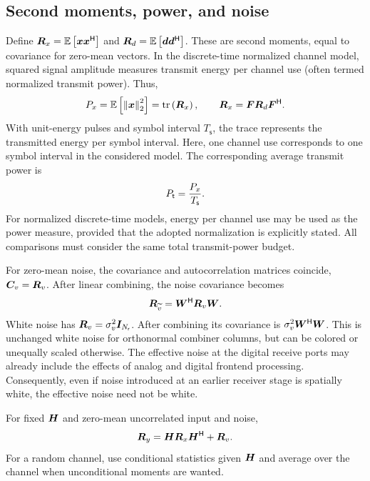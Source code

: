 \subsection{Second moments, power, and noise}
Define $\bm{R}_x=\mathbb{E}\left[\bm{x}{\bm{x}}^{\mathsf{H}}\right]$ and $\bm{R}_d=\mathbb{E}\left[\bm{d}{\bm{d}}^{\mathsf{H}}\right]$. These are second moments, equal to covariance for zero-mean vectors. In the discrete-time normalized channel model, squared signal amplitude measures transmit energy per channel use (often termed normalized transmit power). Thus,
\begin{equation}\label{eq:power}
P_x=\mathbb{E}\left[\left\|\bm{x}\right\|_2^2\right]=\operatorname{tr}\left(\bm{R}_x\right),\qquad
\bm{R}_x=\bm{F}\bm{R}_d{\bm{F}}^{\mathsf{H}}.
\end{equation}
With unit-energy pulses and symbol interval $T_{\mathsf s}$,
the trace represents the transmitted energy per symbol
interval. Here, one channel use corresponds to one symbol interval in the considered model. The corresponding average transmit power is
\begin{equation}
	P_{\mathsf{t}} = \frac{P_x}{T_{\mathsf s}}.
\end{equation}
For normalized discrete-time models, energy per channel use
may be used as the power measure, provided that the adopted
normalization is explicitly stated. All comparisons must
consider the same total transmit-power budget.

For zero-mean noise, the covariance and
autocorrelation matrices coincide,
$\bm{C}_v=\bm{R}_v$. After linear combining,
the noise covariance becomes
\begin{equation}\label{eq:combinednoise}
	\bm{R}_{\widetilde v}
	={\bm{W}}^{\mathsf{H}}\bm{R}_v\bm{W}.
\end{equation}
White noise has $\bm{R}_v=\sigma_v^2\bm{I}_{N_{\mathsf{r}}}$. After combining its covariance is $\sigma_v^2{\bm{W}}^{\mathsf{H}}\bm{W}$. This is unchanged white noise for orthonormal combiner columns, but can be colored or unequally scaled otherwise.
The effective noise at the digital receive ports may already include the effects of analog and digital frontend processing. Consequently, even if noise introduced at an earlier receiver stage is spatially white, the effective noise need not be white.




For fixed $\bm{H}$ and zero-mean uncorrelated input and noise,
\begin{equation}
\bm{R}_y=\bm{H}\bm{R}_x{\bm{H}}^{\mathsf{H}}+\bm{R}_v.
\end{equation}
For a random channel, use conditional statistics given $\bm{H}$ and average over the channel when unconditional moments are wanted.

